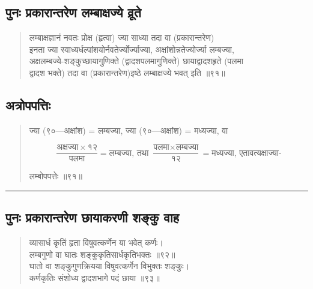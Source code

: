 \documentclass[11pt,a4paper]{article}
\newcommand{\longline}{\noindent\rule{\textwidth}{0.4pt}}
\newcommand{\dev}[1]{{\devanagarifont #1}}
\newenvironment{shloka}{%
  \begin{quote}
  \small
  \setlength{\leftmargin}{2em}
  \devanagarifont
}{\end{quote}}
\newenvironment{vyakhya}{%
  \begin{quote}
  \small
  \setlength{\leftmargin}{1em}
  \devanagarifont
}{\end{quote}}
\newcommand{\skt}[1]{{\devanagarifont #1}}
\begin{document}
\subsection{\dev{पुनः प्रकारान्तरेण लम्बाक्षज्ये व्रूते}}

\begin{shloka}
\skt{लम्बाक्षज्ञानं नवतः प्रोक्ष (हृत्वा) ज्या साध्या तदा वा (प्रकारान्तरेण)}\\
\skt{इनता ज्या स्वाध्यर्धल्पांशयोर्नवतेर्ज्योर्ज्याज्या, अक्षांशोन्नतेज्योर्ज्या लम्बज्या,}\\
\skt{अक्षलम्बज्ये-शङ्कुच्छायागुणिक्ते (द्वादशपलमागुणिक्ते) छायाद्वादशहृते (पलमा}\\
\skt{द्वादश भक्ते) तदा वा (प्रकारान्तरेण)इष्‍ठे लम्बाक्षज्ये भवत् इति ॥९१॥}
\end{shloka}

\subsection{\dev{अत्रोपपत्तिः}}

\begin{vyakhya}
\skt{ज्या (९०—अक्षांश) = लम्बज्या, ज्या (९०—अक्षांश) = मध्यज्या, वा}

\begin{equation*}
\frac{\text{अक्षज्या} \times १२}{\text{पलमा}} = \text{लम्बज्या, तथा } \frac{\text{पलमा} \times \text{लम्बज्या}}{१२} = \text{मध्यज्या, एतावत्यक्षाज्या-}
\end{equation*}

\skt{लम्बोपपत्तेः ॥९१॥}
\end{vyakhya}

\longline

\subsection{\dev{पुनः प्रकारान्तरेण छायाकरणी शङ्कु वाह}}

\begin{shloka}
\skt{व्यासार्ध कृतिं हृता विषुवत्कर्णेन या भवेत् कर्णः।}\\
\skt{लम्बगुणो वा घातः शङ्कुकृतिसार्धकृतिभक्तः ॥९२॥}\\[0.3em]
\skt{घातो वा शङ्कुगुणक्रियया विषुवत्कर्णेन विभुक्तः शङ्कुः।}\\
\skt{कर्णकृतिः संशोध्य द्वादशभागे पदं छाया ॥९३॥}
\end{shloka}
\end{document}
